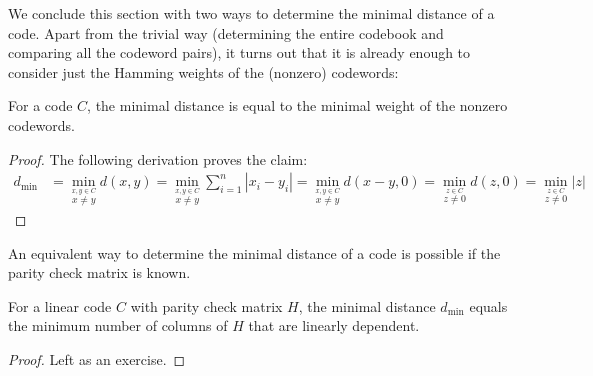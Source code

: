 We conclude this section with two ways to determine the minimal distance of a code. Apart from the trivial way (determining the entire codebook and comparing all the codeword pairs), it turns out that it is already enough to consider just the Hamming weights of the (nonzero) codewords:


\begin{proposition}
For a code $C$, the minimal distance is equal to the minimal weight of the nonzero codewords.
\end{proposition}
\begin{proof}
The following derivation proves the claim:
\begin{align}
d_{\min} &= \min_{\stackrel{x,y \in C}{x \neq y}} d(x,y) 
= \min_{\stackrel{x,y \in C}{x \neq y}} \sum_{i=1}^n |x_i - y_i| 
= \min_{\stackrel{x,y \in C}{x \neq y}} d(x-y,0)
= \min_{\stackrel{z \in C}{z \neq 0}} d(z,0)
= \min_{\stackrel{z \in C}{z \neq 0}} |z|
\end{align}
\end{proof}

An equivalent way to determine the minimal distance of a code is possible if the parity check matrix is known.

\begin{proposition}
For a linear code $C$ with parity check matrix $H$, the minimal distance $d_{\min}$ equals the minimum number of columns of $H$ that are linearly dependent.
\end{proposition}
\begin{proof}
Left as an exercise.
\end{proof}


